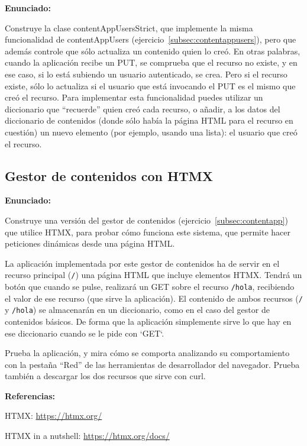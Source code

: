 \textbf{Enunciado:}

Construye la clase contentAppUsersStrict, que implemente la misma funcionalidad de contentAppUsers (ejercicio~\ref{subsec:contentappusers}), pero que además controle que sólo actualiza un contenido quien lo creó. En otras palabras, cuando la aplicación recibe un PUT, se comprueba que el recurso no existe, y en ese caso, si lo está subiendo un usuario autenticado, se crea. Pero si el recurso existe, sólo lo actualiza si el usuario que está invocando el PUT es el mismo que creó el recurso. Para implementar esta funcionalidad puedes utilizar un diccionario que ``recuerde'' quien creó cada recurso, o añadir, a los datos del diccionario de contenidos (donde sólo había la página HTML para el recurso en cuestión) un nuevo elemento (por ejemplo, usando una lista): el usuario que creó el recurso.

\subsection{Gestor de contenidos con HTMX}
\label{subsec:contentapp-htmx}

\textbf{Enunciado:}

Construye una versión del gestor de contenidos (ejercicio~\ref{subsec:contentapp}) que utilice HTMX, para probar cómo funciona este sistema, que permite hacer peticiones dinámicas desde una página HTML.

La aplicación implementada por este gestor de contenidos ha de servir en el recurso principal (\verb|/|) una página HTML que incluye elementos HTMX. Tendrá un botón que cuando se pulse, realizará un GET sobre el recurso \verb|/hola|, recibiendo el valor de ese recurso (que sirve la aplicación). El contenido de ambos recursos (\verb|/| y \verb|/hola|) se almacenarán en un diccionario, como en el caso del gestor de contenidos básicos. De forma que la aplicación simplemente sirve lo que hay en ese diccionario cuando se le pide con `GET`.

Prueba la aplicación, y mira cómo se comporta analizando su comportamiento con la pestaña ``Red'' de las herramientas de desarrollador del navegador. Prueba también a descargar los dos recursos que sirve con curl.

\textbf{Referencias:}

HTMX: \url{https://htmx.org/}

HTMX in a nutshell: \url{https://htmx.org/docs/}

